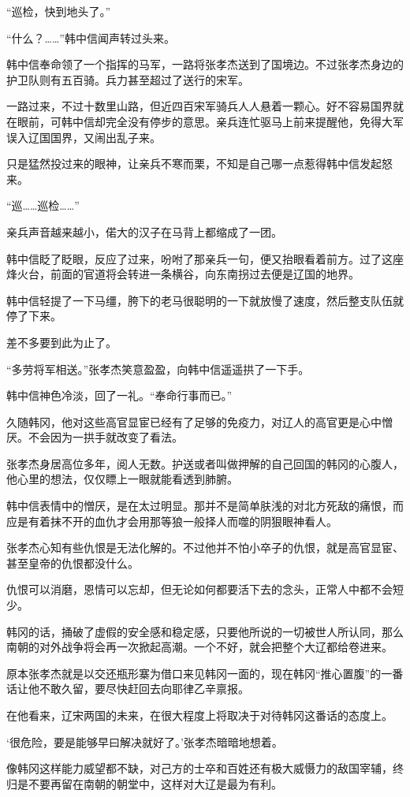 “巡检，快到地头了。”

“什么？……”韩中信闻声转过头来。

韩中信奉命领了一个指挥的马军，一路将张孝杰送到了国境边。不过张孝杰身边的护卫队则有五百骑。兵力甚至超过了送行的宋军。

一路过来，不过十数里山路，但近四百宋军骑兵人人悬着一颗心。好不容易国界就在眼前，可韩中信却完全没有停步的意思。亲兵连忙驱马上前来提醒他，免得大军误入辽国国界，又闹出乱子来。

只是猛然投过来的眼神，让亲兵不寒而栗，不知是自己哪一点惹得韩中信发起怒来。

“巡……巡检……”

亲兵声音越来越小，偌大的汉子在马背上都缩成了一团。

韩中信眨了眨眼，反应了过来，吩咐了那亲兵一句，便又抬眼看着前方。过了这座烽火台，前面的官道将会转进一条横谷，向东南拐过去便是辽国的地界。

韩中信轻提了一下马缰，胯下的老马很聪明的一下就放慢了速度，然后整支队伍就停了下来。

差不多要到此为止了。

“多劳将军相送。”张孝杰笑意盈盈，向韩中信遥遥拱了一下手。

韩中信神色冷淡，回了一礼。“奉命行事而已。”

久随韩冈，他对这些高官显宦已经有了足够的免疫力，对辽人的高官更是心中憎厌。不会因为一拱手就改变了看法。

张孝杰身居高位多年，阅人无数。护送或者叫做押解的自己回国的韩冈的心腹人，他心里的想法，仅仅瞟上一眼就能看透到肺腑。

韩中信表情中的憎厌，是在太过明显。那并不是简单肤浅的对北方死敌的痛恨，而应是有着抹不开的血仇才会用那等狼一般择人而噬的阴狠眼神看人。

张孝杰心知有些仇恨是无法化解的。不过他并不怕小卒子的仇恨，就是高官显宦、甚至皇帝的仇恨都没什么。

仇恨可以消磨，恩情可以忘却，但无论如何都要活下去的念头，正常人中都不会短少。

韩冈的话，捅破了虚假的安全感和稳定感，只要他所说的一切被世人所认同，那么南朝的对外战争将会再一次掀起高潮。一个不好，就会把整个大辽都给卷进来。

原本张孝杰就是以交还瓶形寨为借口来见韩冈一面的，现在韩冈“推心置腹”的一番话让他不敢久留，要尽快赶回去向耶律乙辛禀报。

在他看来，辽宋两国的未来，在很大程度上将取决于对待韩冈这番话的态度上。

‘很危险，要是能够早曰解决就好了。’张孝杰暗暗地想着。

像韩冈这样能力威望都不缺，对己方的士卒和百姓还有极大威慑力的敌国宰辅，终归是不要再留在南朝的朝堂中，这样对大辽是最为有利。

